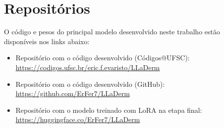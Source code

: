 \chapter{Repositórios}

O código e pesos do principal modelo desenvolvido neste trabalho estão disponíveis nos links abaixo:

\begin{itemize}
    \item Repositório com o código desenvolvido (Códigos@UFSC): \\
    \url{https://codigos.ufsc.br/eric.f.evaristo/LLaDerm}
    \item Repositório com o código desenvolvido (GitHub): \\
    \url{https://github.com/ErFer7/LLaDerm}
    \item Repositório com o modelo treinado com \ac{LoRA} na etapa final: \\
    \url{https://huggingface.co/ErFer7/LLaDerm}
\end{itemize}
